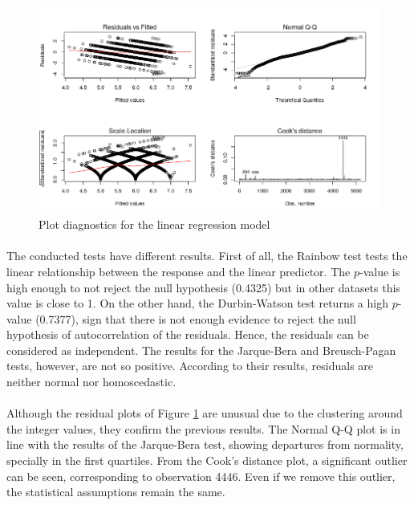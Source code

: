 \documentclass[10pt]{article}
\begin{document}
\begin{figure}[H]
	\centering
	\includegraphics[width=5in]{figures/qqplot.png}
	\caption{Plot diagnostics for the linear regression model} 
	\label{figure:qqplot}
\end{figure}

\paragraph*{}
The conducted tests have different results. First of all, the Rainbow test tests the linear relationship between the response and the linear predictor. The $p$-value is high enough to not reject the null hypothesis (0.4325) but in other datasets this value is close to 1. On the other hand, the Durbin-Watson test returns a high $p$-value (0.7377), sign that there is not enough evidence to reject the null hypothesis of autocorrelation of the residuals. Hence, the residuals can be considered as independent. The results for the Jarque-Bera and Breusch-Pagan tests, however, are not so positive. According to their results, residuals are neither normal nor homoscedastic.

\paragraph*{}
Although the residual plots of Figure \ref{figure:qqplot} are unusual due to the clustering around the integer values, they confirm the previous results. The Normal Q-Q plot is in line with the results of the Jarque-Bera test, showing departures from normality, specially in the first quartiles. From the Cook's distance plot, a significant outlier can be seen, corresponding to observation 4446. Even if we remove this outlier, the statistical assumptions remain the same.
\end{document}
